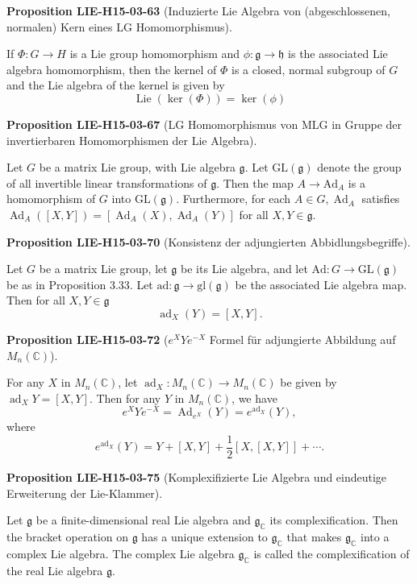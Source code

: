 \documentclass[10pt, letterpaper]{article}
\newcommand{\C}{\mathbb{C}}
\newcommand{\CustomHeading}[3]{%
  \par\medskip\noindent%
  \textbf{#1 #2} \textnormal{(#3)}.\enskip%
}
\newenvironment{PROP}[2]{\CustomHeading{Proposition}{#1}{#2}}{}
\begin{document}
\begin{PROP}{LIE-H15-03-63}{Induzierte Lie Algebra von (abgeschlossenen, normalen) Kern eines LG Homomorphismus}
If $\Phi: G \rightarrow H$ is a Lie group homomorphism and $\phi: \mathfrak{g} \rightarrow \mathfrak{h}$ is the associated Lie algebra homomorphism, then the kernel of $\Phi$ is a closed, normal subgroup of $G$ and the Lie algebra of the kernel is given by
$$
\operatorname{Lie}(\operatorname{ker}(\Phi))=\operatorname{ker}(\phi)
$$
\end{PROP}

\begin{PROP}{LIE-H15-03-67}{LG Homomorphismus von MLG in Gruppe der invertierbaren Homomorphismen der Lie Algebra}
Let $G$ be a matrix Lie group, with Lie algebra $\mathfrak{g}$. Let $\mathrm{GL}(\mathfrak{g})$ denote the group of all invertible linear transformations of $\mathfrak{g}$. Then the map $A \rightarrow \mathrm{Ad}_{A}$ is a homomorphism of $G$ into $\mathrm{GL}(\mathfrak{g})$. Furthermore, for each $A \in G, \operatorname{Ad}_{A}$ satisfies $\operatorname{Ad}_{A}([X, Y])=\left[\operatorname{Ad}_{A}(X), \operatorname{Ad}_{A}(Y)\right]$ for all $X, Y \in \mathfrak{g}$.
\end{PROP}

\begin{PROP}{LIE-H15-03-70}{Konsistenz der adjungierten Abbidlungsbegriffe}
Let $G$ be a matrix Lie group, let $\mathfrak{g}$ be its Lie algebra, and let $\mathrm{Ad}: G \rightarrow \mathrm{GL}(\mathfrak{g})$ be as in Proposition 3.33. Let $\mathrm{ad}: \mathfrak{g} \rightarrow \mathrm{gl}(\mathfrak{g})$ be the associated Lie algebra map. Then for all $X, Y \in \mathfrak{g}$
$$
\operatorname{ad}_{X}(Y)=[X, Y] .
$$
\end{PROP}

\begin{PROP}{LIE-H15-03-72}{$e^XYe^{-X}$ Formel für adjungierte Abbildung auf $M_n(\C)$}
For any $X$ in $M_{n}(\mathbb{C})$, let $\operatorname{ad}_{X}: M_{n}(\mathbb{C}) \rightarrow M_{n}(\mathbb{C})$ be given by $\operatorname{ad}_{X} Y=[X, Y]$. Then for any $Y$ in $M_{n}(\mathbb{C})$, we have
$$
e^{X} Y e^{-X}=\operatorname{Ad}_{e^{X}}(Y)=e^{\operatorname{ad}_{X}}(Y),
$$
where
$$
e^{\operatorname{ad}_{X}}(Y)=Y+[X, Y]+\frac{1}{2}[X,[X, Y]]+\cdots .
$$
\end{PROP}

\begin{PROP}{LIE-H15-03-75}{Komplexifizierte Lie Algebra und eindeutige Erweiterung der Lie-Klammer}
Let $\mathfrak{g}$ be a finite-dimensional real Lie algebra and $\mathfrak{g}_{\mathbb{C}}$ its complexification. Then the bracket operation on $\mathfrak{g}$ has a unique extension to $\mathfrak{g}_{\mathbb{C}}$ that makes $\mathfrak{g}_{\mathbb{C}}$ into a complex Lie algebra. The complex Lie algebra $\mathfrak{g}_{\mathbb{C}}$ is called the complexification of the real Lie algebra $\mathfrak{g}$.
\end{PROP}
\end{document}
